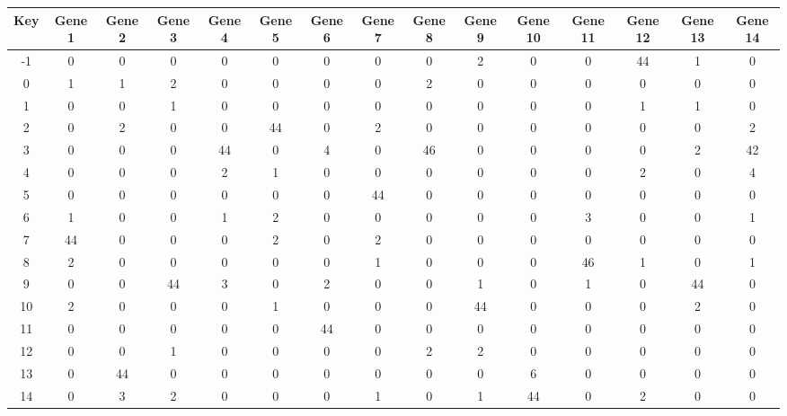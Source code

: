 \begin{tabular}{|c|c|c|c|c|c|c|c|c|c|c|c|c|c|c|}
\hline
Key & Gene 1 & Gene 2 & Gene 3 & Gene 4 & Gene 5 & Gene 6 & Gene 7 & Gene 8 & Gene 9 & Gene 10 & Gene 11 & Gene 12 & Gene 13 & Gene 14 \\
\hline
-1 & 0 & 0 & 0 & 0 & 0 & 0 & 0 & 0 & 2 & 0 & 0 & 44 & 1 & 0 \\
0 & 1 & 1 & 2 & 0 & 0 & 0 & 0 & 2 & 0 & 0 & 0 & 0 & 0 & 0 \\
1 & 0 & 0 & 1 & 0 & 0 & 0 & 0 & 0 & 0 & 0 & 0 & 1 & 1 & 0 \\
2 & 0 & 2 & 0 & 0 & 44 & 0 & 2 & 0 & 0 & 0 & 0 & 0 & 0 & 2 \\
3 & 0 & 0 & 0 & 44 & 0 & 4 & 0 & 46 & 0 & 0 & 0 & 0 & 2 & 42 \\
4 & 0 & 0 & 0 & 2 & 1 & 0 & 0 & 0 & 0 & 0 & 0 & 2 & 0 & 4 \\
5 & 0 & 0 & 0 & 0 & 0 & 0 & 44 & 0 & 0 & 0 & 0 & 0 & 0 & 0 \\
6 & 1 & 0 & 0 & 1 & 2 & 0 & 0 & 0 & 0 & 0 & 3 & 0 & 0 & 1 \\
7 & 44 & 0 & 0 & 0 & 2 & 0 & 2 & 0 & 0 & 0 & 0 & 0 & 0 & 0 \\
8 & 2 & 0 & 0 & 0 & 0 & 0 & 1 & 0 & 0 & 0 & 46 & 1 & 0 & 1 \\
9 & 0 & 0 & 44 & 3 & 0 & 2 & 0 & 0 & 1 & 0 & 1 & 0 & 44 & 0 \\
10 & 2 & 0 & 0 & 0 & 1 & 0 & 0 & 0 & 44 & 0 & 0 & 0 & 2 & 0 \\
11 & 0 & 0 & 0 & 0 & 0 & 44 & 0 & 0 & 0 & 0 & 0 & 0 & 0 & 0 \\
12 & 0 & 0 & 1 & 0 & 0 & 0 & 0 & 2 & 2 & 0 & 0 & 0 & 0 & 0 \\
13 & 0 & 44 & 0 & 0 & 0 & 0 & 0 & 0 & 0 & 6 & 0 & 0 & 0 & 0 \\
14 & 0 & 3 & 2 & 0 & 0 & 0 & 1 & 0 & 1 & 44 & 0 & 2 & 0 & 0 \\
\hline
\end{tabular}
